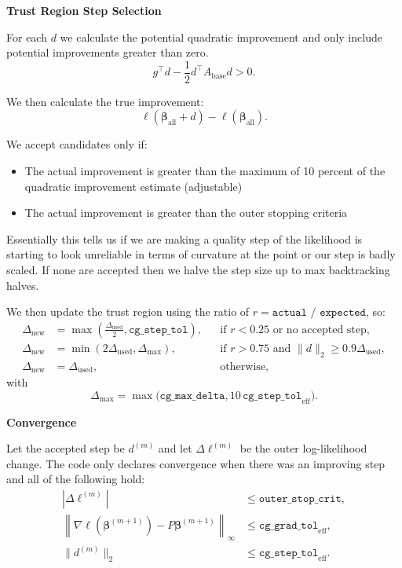 \documentclass{article}
\begin{document}
\textbf{Trust Region Step Selection}

For each $d$ we calculate the potential quadratic improvement and only include potential improvements greater than zero.
\begin{equation*}
g^\top d - \frac{1}{2} d^\top A_{\text{base}} d > 0.
\end{equation*}

We then calculate the true improvement:
\begin{equation*}
\ell(\bm{\beta}_{\text{all}} + d) - \ell(\bm{\beta}_{\text{all}}).
\end{equation*}

We accept candidates only if:
\begin{itemize}
    \item The actual improvement is greater than the maximum of 10 percent of the quadratic improvement estimate (adjustable)
    \item The actual improvement is greater than the outer stopping criteria 
\end{itemize}

Essentially this tells us if we are making a quality step of the likelihood is starting to look unreliable in terms of curvature at the point or our step is badly scaled. If none are accepted then we halve the step size up to max backtracking halves.

We then update the trust region using the ratio of $r = \texttt{actual / expected}$, so:
\begin{align*}
\Delta_{\text{new}} &= \max\left(\frac{\Delta_{\text{used}}}{2}, \texttt{cg\_step\_tol}\right), && \text{if } r < 0.25 \text{ or no accepted step}, \\
\Delta_{\text{new}} &= \min\left(2\Delta_{\text{used}}, \Delta_{\max}\right), && \text{if } r > 0.75 \text{ and } \|d\|_2 \ge 0.9\Delta_{\text{used}}, \\
\Delta_{\text{new}} &= \Delta_{\text{used}}, && \text{otherwise},
\end{align*}
with
\begin{equation*}
\Delta_{\max} = \max\bigl(\texttt{cg\_max\_delta}, 10\,\texttt{cg\_step\_tol}_{\text{eff}}\bigr).
\end{equation*}

\textbf{Convergence}

Let the accepted step be $d^{(m)}$ and let $\Delta \ell^{(m)}$ be the outer log-likelihood change.
The code only declares convergence when there was an improving step and all of the following hold:
\begin{align*}
|\Delta \ell^{(m)}| &\le \texttt{outer\_stop\_crit}, \\
\left\|\nabla \ell(\bm{\beta}^{(m+1)}) - P\bm{\beta}^{(m+1)}\right\|_\infty &\le \texttt{cg\_grad\_tol}_{\text{eff}}, \\
\|d^{(m)}\|_2 &\le \texttt{cg\_step\_tol}_{\text{eff}}.
\end{align*}
\end{document}
